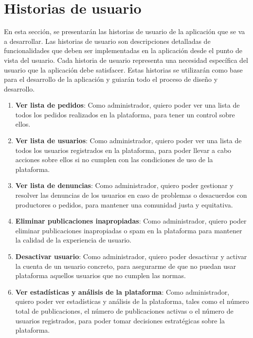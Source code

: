 
\section{Historias de usuario}\label{sec:historias-usuario}

En esta sección, se presentarán las historias de usuario de la aplicación que se va a desarrollar. Las historias de usuario son descripciones detalladas de funcionalidades que deben ser implementadas en la aplicación desde el punto de vista del usuario. Cada historia de usuario representa una necesidad específica del usuario que la aplicación debe satisfacer. Estas historias se utilizarán como base para el desarrollo de la aplicación y guiarán todo el proceso de diseño y desarrollo.

\begin{enumerate}[label=HU-\protect\twodigits{\arabic*}:, align=left, leftmargin=*]


\item \textbf{Ver lista de pedidos}: Como administrador, quiero poder ver una lista de todos los pedidos realizados en la plataforma, para tener un control sobre ellos.

\item \textbf{Ver lista de usuarios}: Como administrador, quiero poder ver una lista de todos los usuarios registrados en la plataforma, para poder llevar a cabo acciones sobre ellos si no cumplen con las condiciones de uso de la plataforma.

\item \textbf{Ver lista de denuncias}: Como administrador, quiero poder gestionar y resolver las denuncias de los usuarios en caso de problemas o desacuerdos con productores o pedidos, para mantener una comunidad justa y equitativa.

\item \textbf{Eliminar publicaciones inapropiadas}: Como administrador, quiero poder eliminar publicaciones inapropiadas o spam en la plataforma para mantener la calidad de la experiencia de usuario.

\item \textbf{Desactivar usuario}: Como administrador, quiero poder desactivar y activar la cuenta de un usuario concreto, para asegurarme de que no puedan usar plataforma aquellos usuarios que no cumplen las normas.

\item \textbf{Ver estadísticas y análisis de la plataforma}: Como administrador, quiero poder ver estadísticas y análisis de la plataforma, tales como el número total de publicaciones, el número de publicaciones activas o el número de usuarios registrados, para poder tomar decisiones estratégicas sobre la plataforma.


\end{enumerate}
